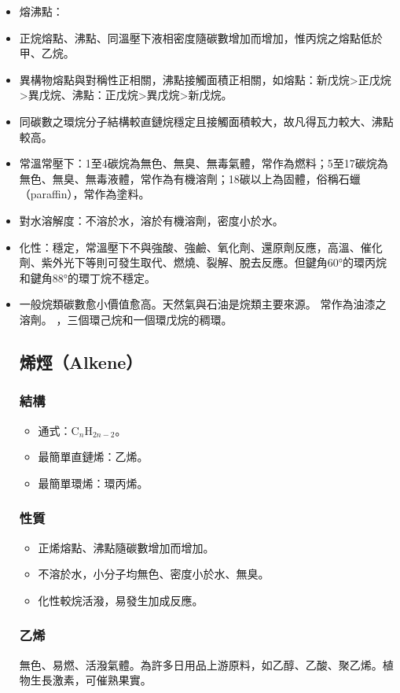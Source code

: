 \documentclass[a4paper,12pt]{report}
\begin{document}
\begin{itemize}
\item 熔沸點：
\bit
\item 正烷熔點、沸點、同溫壓下液相密度隨碳數增加而增加，惟丙烷之熔點低於甲、乙烷。
\item 異構物熔點與對稱性正相關，沸點接觸面積正相關，如熔點：新戊烷>正戊烷>異戊烷、沸點：正戊烷>異戊烷>新戊烷。
\item 同碳數之環烷分子結構較直鏈烷穩定且接觸面積較大，故凡得瓦力較大、沸點較高。
\item 常溫常壓下：1至4碳烷為無色、無臭、無毒氣體，常作為燃料；5至17碳烷為無色、無臭、無毒液體，常作為有機溶劑；18碳以上為固體，俗稱石蠟（paraffin），常作為塗料。
\eit
\item 對水溶解度：不溶於水，溶於有機溶劑，密度小於水。
\item 化性：穩定，常溫壓下不與強酸、強鹼、氧化劑、還原劑反應，高溫、催化劑、紫外光下等則可發生取代、燃燒、裂解、脫去反應。但鍵角60°的環丙烷和鍵角88°的環丁烷不穩定。
\item 一般烷類碳數愈小價值愈高。天然氣與石油是烷類主要來源。
\eit
{}
常作為油漆之溶劑。
，三個環己烷和一個環戊烷的稠環。
\subsection{烯烴（Alkene）}
\subsubsection{結構}
\begin{itemize}
\item 通式：\( \text{C}_n\text{H}_{2n-2} \)。
\item 最簡單直鏈烯：乙烯。
\item 最簡單環烯：環丙烯。
\end{itemize}
\subsubsection{性質}
\begin{itemize}
\item 正烯熔點、沸點隨碳數增加而增加。
\item 不溶於水，小分子均無色、密度小於水、無臭。
\item 化性較烷活潑，易發生加成反應。
\end{itemize}
\subsubsection{乙烯}
無色、易燃、活潑氣體。為許多日用品上游原料，如乙醇、乙酸、聚乙烯。植物生長激素，可催熟果實。

\end{itemize}
\end{document}
